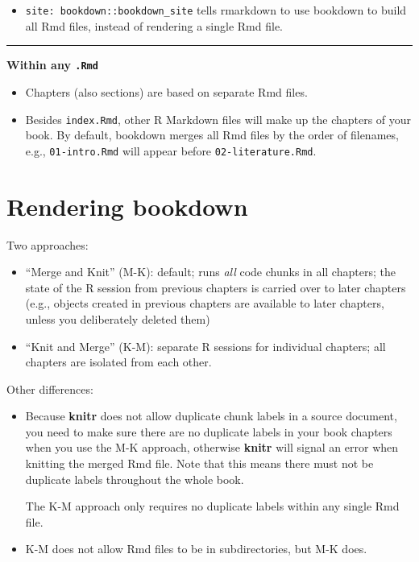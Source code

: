 \documentclass[
  a4paper,
  twoside,
  openright]{book}
\providecommand{\tightlist}{%
  \setlength{\itemsep}{0pt}\setlength{\parskip}{0pt}}
\theoremstyle{definition}
\theoremstyle{definition}
\theoremstyle{definition}
\theoremstyle{definition}
\theoremstyle{remark}
\begin{document}
\begin{itemize}
\tightlist
\item
  \texttt{site:\ bookdown::bookdown\_site} tells rmarkdown to use bookdown to build all Rmd files, instead of rendering a single Rmd file.
\end{itemize}

\begin{center}\rule{0.5\linewidth}{0.5pt}\end{center}

\textbf{Within any \texttt{.Rmd}}

\begin{itemize}
\tightlist
\item
  Chapters (also sections) are based on separate Rmd files.
\item
  Besides \texttt{index.Rmd}, other R Markdown files will make up the chapters of your book. By default, bookdown merges all Rmd files by the order of filenames, e.g., \texttt{01-intro.Rmd} will appear before \texttt{02-literature.Rmd}.
\end{itemize}

\section{Rendering bookdown}\label{rendering-bookdown}

Two approaches:

\begin{itemize}
\tightlist
\item
  ``Merge and Knit'' (M-K): default; runs \emph{all} code chunks in all chapters; the state of the R session from previous chapters is carried over to later chapters (e.g., objects created in previous chapters are available to later chapters, unless you deliberately deleted them)
\item
  ``Knit and Merge'' (K-M): separate R sessions for individual chapters; all chapters are isolated from each other.
\end{itemize}

Other differences:

\begin{itemize}
\item
  Because \textbf{knitr} does not allow duplicate chunk labels in a source document, you need to make sure there are no duplicate labels in your book chapters when you use the M-K approach, otherwise \textbf{knitr} will signal an error when knitting the merged Rmd file. Note that this means there must not be duplicate labels throughout the whole book.

  The K-M approach only requires no duplicate labels within any single Rmd file.
\item
  K-M does not allow Rmd files to be in subdirectories, but M-K does.
\end{itemize}
\end{document}
